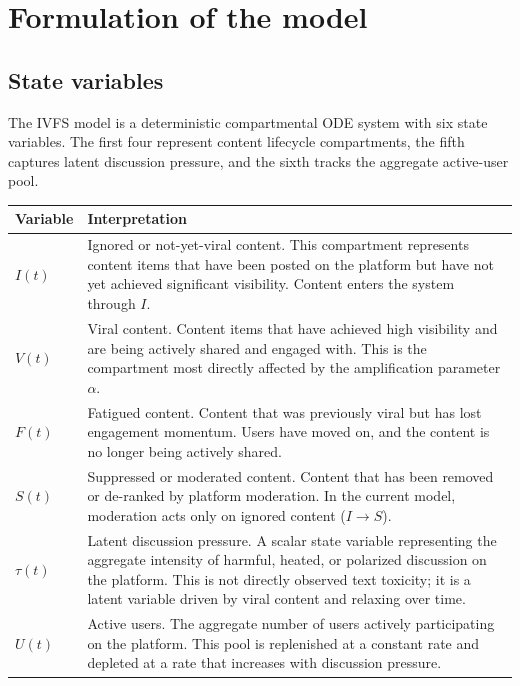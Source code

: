 \documentclass[11pt]{article}
\begin{document}
\section{Formulation of the model}
\label{sec:formulation}

\subsection{State variables}
\label{sec:states}

The IVFS model is a deterministic compartmental ODE system with six state variables. The first four represent content lifecycle compartments, the fifth captures latent discussion pressure, and the sixth tracks the aggregate active-user pool.

\begin{center}
\begin{tabular}{>{\raggedright\arraybackslash}p{1.6cm} >{\raggedright\arraybackslash}p{11cm}}
\toprule
Variable & Interpretation \\
\midrule
$I(t)$ & Ignored or not-yet-viral content. This compartment represents content items that have been posted on the platform but have not yet achieved significant visibility. Content enters the system through $I$. \\[0.3em]
$V(t)$ & Viral content. Content items that have achieved high visibility and are being actively shared and engaged with. This is the compartment most directly affected by the amplification parameter $\alpha$. \\[0.3em]
$F(t)$ & Fatigued content. Content that was previously viral but has lost engagement momentum. Users have moved on, and the content is no longer being actively shared. \\[0.3em]
$S(t)$ & Suppressed or moderated content. Content that has been removed or de-ranked by platform moderation. In the current model, moderation acts only on ignored content ($I \to S$). \\[0.3em]
$\tau(t)$ & Latent discussion pressure. A scalar state variable representing the aggregate intensity of harmful, heated, or polarized discussion on the platform. This is not directly observed text toxicity; it is a latent variable driven by viral content and relaxing over time. \\[0.3em]
$U(t)$ & Active users. The aggregate number of users actively participating on the platform. This pool is replenished at a constant rate and depleted at a rate that increases with discussion pressure. \\
\bottomrule
\end{tabular}
\end{center}
\end{document}
